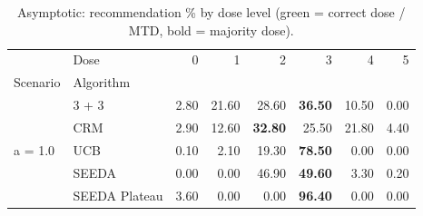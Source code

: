 \begin{table}[H]
\centering
\caption{Asymptotic: recommendation \% by dose level (green = correct dose / MTD, bold = majority dose).}
\label{tab:asym_rec_by_dose}
\begin{tabular}{llrrrrrr}
\toprule
 & Dose & 0 & 1 & 2 & 3 & 4 & 5 \\
Scenario & Algorithm &  &  &  &  &  &  \\
\midrule
\multirow[c]{5}{*}{a = 1.0} & 3 + 3 & 2.80 & 21.60 & {\cellcolor[HTML]{C8E6C9}} 28.60 & \bfseries 36.50 & 10.50 & 0.00 \\
 & CRM & 2.90 & 12.60 & {\cellcolor[HTML]{C8E6C9}} \bfseries 32.80 & 25.50 & 21.80 & 4.40 \\
 & UCB & 0.10 & 2.10 & {\cellcolor[HTML]{C8E6C9}} 19.30 & \bfseries 78.50 & 0.00 & 0.00 \\
 & SEEDA & 0.00 & 0.00 & {\cellcolor[HTML]{C8E6C9}} 46.90 & \bfseries 49.60 & 3.30 & 0.20 \\
 & SEEDA Plateau & 3.60 & 0.00 & {\cellcolor[HTML]{C8E6C9}} 0.00 & \bfseries 96.40 & 0.00 & 0.00 \\
\bottomrule
\end{tabular}
\end{table}
